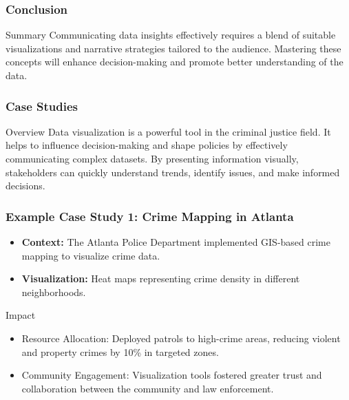 \documentclass[aspectratio=169]{beamer}
\begin{document}
\begin{frame}[fragile]
    \frametitle{Conclusion}
    \begin{block}{Summary}
        Communicating data insights effectively requires a blend of suitable visualizations and narrative strategies tailored to the audience. Mastering these concepts will enhance decision-making and promote better understanding of the data.
    \end{block}
\end{frame}

\begin{frame}[fragile]
    \frametitle{Case Studies}
    \begin{block}{Overview}
        Data visualization is a powerful tool in the criminal justice field. It helps to influence decision-making and shape policies by effectively communicating complex datasets. By presenting information visually, stakeholders can quickly understand trends, identify issues, and make informed decisions.
    \end{block}
\end{frame}

\begin{frame}[fragile]
    \frametitle{Example Case Study 1: Crime Mapping in Atlanta}
    \begin{itemize}
        \item \textbf{Context:} The Atlanta Police Department implemented GIS-based crime mapping to visualize crime data.
        \item \textbf{Visualization:} Heat maps representing crime density in different neighborhoods.
    \end{itemize}
    \begin{block}{Impact}
        \begin{itemize}
            \item Resource Allocation: Deployed patrols to high-crime areas, reducing violent and property crimes by 10\% in targeted zones.
            \item Community Engagement: Visualization tools fostered greater trust and collaboration between the community and law enforcement.
        \end{itemize}
    \end{block}
\end{frame}
\end{document}
